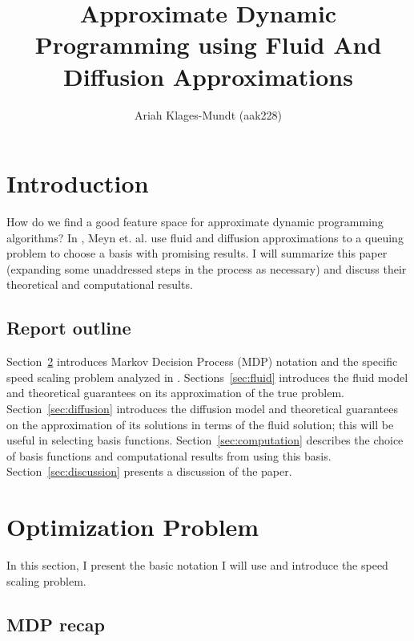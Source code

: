 \documentclass[11pt]{article}
\title{Approximate Dynamic Programming using Fluid And Diffusion Approximations}
\author{Ariah Klages-Mundt (aak228)}
\begin{document}
\maketitle


\newcommand{\RR}{\mathbb{R}}



\section{Introduction}
How do we find a good feature space for approximate dynamic programming algorithms? In \cite{paper}, Meyn et. al. use fluid and diffusion approximations to a queuing problem to choose a basis with promising results. I will summarize this paper (expanding some unaddressed steps in the process as necessary) and discuss their theoretical and computational results.

\subsection{Report outline}
Section~\ref{sec:opt_prob} introduces Markov Decision Process (MDP) notation and the specific speed scaling problem analyzed in \cite{paper}. Sections~\ref{sec:fluid} introduces the fluid model and theoretical guarantees on its approximation of the true problem. Section~\ref{sec:diffusion} introduces the diffusion model and theoretical guarantees on the approximation of its solutions in terms of the fluid solution; this will be useful in selecting basis functions. Section~\ref{sec:computation} describes the choice of basis functions and computational results from \cite{paper} using this basis. Section~\ref{sec:discussion} presents a discussion of the paper.



\section{Optimization Problem} \label{sec:opt_prob}
In this section, I present the basic notation I will use and introduce the speed scaling problem.

\subsection{MDP recap}
\end{document}
